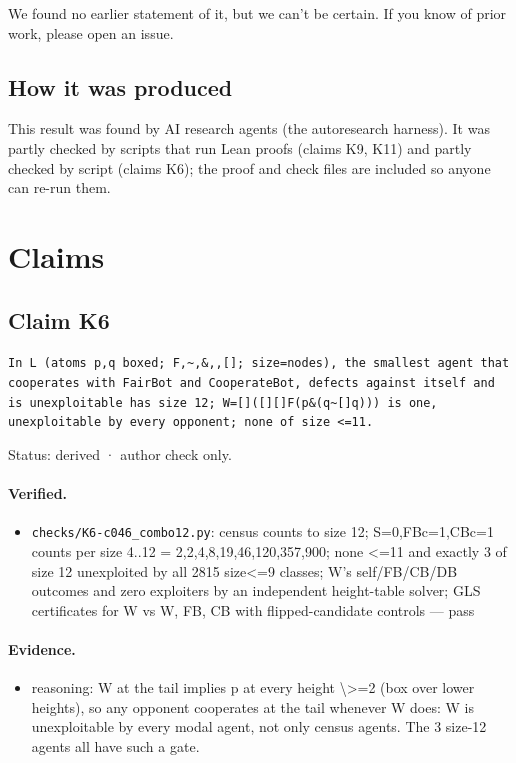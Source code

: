 \documentclass{article}
\begin{document}
We found no earlier statement of it, but we can't be certain. If you know of prior work, please open an issue.

\subsection*{How it was produced}

This result was found by AI research agents (the autoresearch harness). It was partly checked by scripts that run Lean proofs (claims K9, K11) and partly checked by script (claims K6); the proof and check files are included so anyone can re-run them.

\section{Claims}

\subsection*{Claim K6}

\texttt{In L (atoms p,q boxed; F,\textasciitilde{},\&,\textbar{},[]; size=nodes), the smallest agent that cooperates with FairBot and CooperateBot, defects against itself and is unexploitable has size 12; W=[]([][]F\textbar{}(p\&(q\textbar{}\textasciitilde{}[]q))) is one, unexploitable by every opponent; none of size \textless{}=11.}

Status: derived · author check only.

\paragraph{Verified.}
\begin{itemize}
\item \texttt{checks/K6-c046\_combo12.py}: census counts to size 12; S=0,FBc=1,CBc=1 counts per size 4..12 = 2,2,4,8,19,46,120,357,900; none \textless{}=11 and exactly 3 of size 12 unexploited by all 2815 size\textless{}=9 classes; W's self/FB/CB/DB outcomes and zero exploiters by an independent height-table solver; GLS certificates for W vs W, FB, CB with flipped-candidate controls --- pass
\end{itemize}

\paragraph{Evidence.}
\begin{itemize}
\item reasoning: W at the tail implies p at every height \textbackslash{}\textgreater{}=2 (box over lower heights), so any opponent cooperates at the tail whenever W does: W is unexploitable by every modal agent, not only census agents. The 3 size-12 agents all have such a gate.
\end{itemize}
\end{document}
